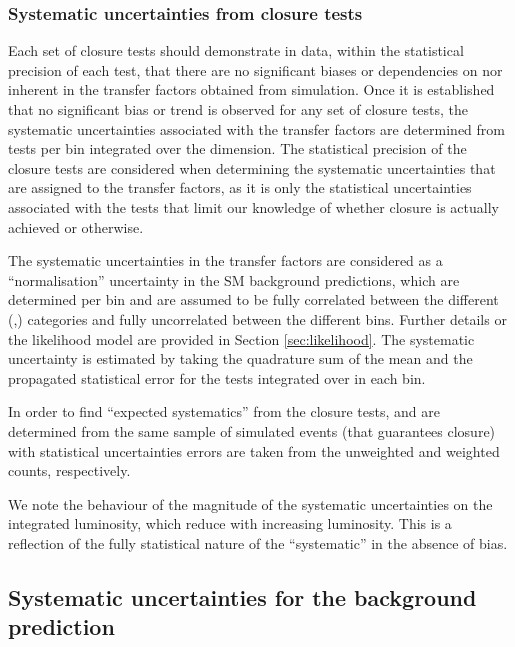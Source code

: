 \subsubsection{Systematic uncertainties from closure tests\label{sec:syst-from-closure}}

Each set of closure tests should demonstrate in data, within the
statistical precision of each test, that there are no significant
biases or dependencies on \njet nor \scalht inherent in the transfer
factors obtained from simulation. 
Once it is established that no significant bias or trend is observed
for any set of closure tests, the systematic uncertainties associated
with the transfer factors are determined from tests per \scalht bin
integrated over the \njet dimension. The statistical precision of the 
closure tests are considered
when determining the systematic uncertainties that are assigned to the
transfer factors, as it is only the statistical uncertainties
associated with the tests that limit our knowledge of whether closure
is actually achieved or otherwise. 

The systematic uncertainties in the transfer factors are considered as
a ``normalisation'' uncertainty in the SM background predictions,
which are determined per \scalht bin and are
assumed to be fully correlated between the different (\njet,\nb)
categories and fully uncorrelated between the different \scalht bins. 
Further details or the likelihood model
are provided in Section \ref{sec:likelihood}. The systematic
uncertainty is estimated by taking the quadrature sum of the 
mean and the propagated statistical error for the tests integrated
over \njet in each \scalht bin.

In order to find ``expected systematics'' from the closure tests, \nobs and \npre are
determined from the same sample of simulated events (that guarantees
closure) with statistical uncertainties errors are taken from the
unweighted and weighted counts, respectively. 

We note the behaviour of the magnitude of the systematic uncertainties
on the integrated luminosity, which reduce with increasing
luminosity. This is a reflection of the fully statistical nature of
the ``systematic'' in the absence of bias.

\subsection{Systematic uncertainties for the \znunu background
prediction}

